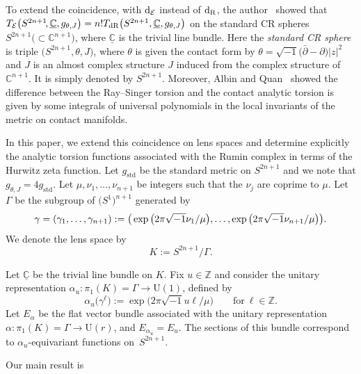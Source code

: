 \documentclass[10pt,a4paper]{amsart}
\numberwithin{equation}{section}
\newcommand{\ii}{\sqrt{-1}}
\newcommand{\deRham}{\mathrm{dR}}
\newcommand{\Rumin}{\mathrm{R}}
\newcommand{\RN}{\cE}
\newcommand{\bC}{\mathbb{C}}
\newcommand{\cE}{\mathcal{E}}
\begin{document}
To extend the coincidence,
with ${\rm d}_{\RN}$ instead of ${\rm d}_{\Rumin }$,
the author~\cite{Kitaoka-19} showed that $T_{\RN } \big(S^{2n+1}\!, \underline{\bC}, g_{\theta , J} \big) \\= n! T_{\deRham } \big(S^{2n+1}, \underline{\bC}, g_{\theta , J} \big)$ on the standard CR spheres $S^{2n+1} \big({\subset} \bC^{n+1} \big) $,
where $\underline{\bC}$ is the trivial line bundle.
Here the {\em standard CR sphere} is triple $\big(S^{2n+1}, \theta, J\big)$,
where
$\theta$ is given the contact form by $\theta = \sqrt{-1} \big(\bar{\partial} - \partial\big) |z|^2$
and
$J$ is an almost complex structure $J$ induced from the complex structure of $ \bC^{n+1}$.
It is simply denoted by $S^{2n+1}$.
Moreover, Albin and Quan~\cite[Corollary~3 and equation~(4)]{Albin-Quan-20} showed the difference between the Ray--Singer torsion and the contact analytic torsion is given by some integrals of universal polynomials in the local invariants of the metric
on contact manifolds.

In this paper,
we extend this coincidence on lens spaces
and determine explicitly the analytic torsion functions associated with the Rumin complex
in terms of the Hurwitz zeta function.
Let $g_{\mathrm{std}}$ be the standard metric on $S^{2n+1}$
and we note that $g_{\theta , J} = 4 g_{\mathrm{std}}$.
Let $\mu , \nu_1 , \ldots , \nu_{n+1}$ be integers such that the $\nu_j$ are coprime to $\mu$.
Let $\Gamma$ be the subgroup of $\big(S^1\big)^{n+1}$ generated by
\begin{equation}
 \gamma
 = ( \gamma_1 , \ldots , \gamma_{n+1} )
 := \big( \exp \big( 2 \pi \ii \nu_1 / \mu \big), \dots , \exp \big( 2 \pi \ii \nu_{n+1} / \mu \big) \big) .
 \notag
\end{equation}
We denote the lens space by
\[
 K
 :=
 S^{2n+1} / \Gamma
 .
\]


Let $\underline{\bC}$ be the trivial line bundle on $K$.
Fix $u \in \mathbb{Z}$ and consider the unitary representation $\alpha_u \colon \pi_1 (K) = \Gamma \to \mathrm{U} (1)$, defined by
\[
 \alpha_u \big( \gamma^{\ell} \big) := \exp \big( 2 \pi \ii u \ell / \mu \big)
 \qquad \text{for} \ \ell \in \mathbb{Z}
 .
\]
Let $E_{\alpha}$ be the flat vector bundle associated with the unitary representation ${\alpha \colon \pi_1 (K) = \Gamma \! \to \! \mathrm{U} (r)}$, and $E_{\alpha_u} = E_{u}$.
The sections of this bundle correspond to $\alpha_u$-equivariant functions on~$S^{2n+1}$.


Our main result is
\end{document}
